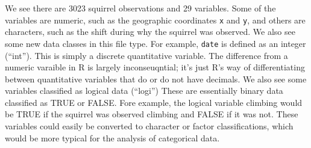 \documentclass[
]{book}
\newenvironment{Shaded}{\begin{snugshade}}{\end{snugshade}}
\newcommand{\ConstantTok}[1]{\textcolor[rgb]{0.56,0.35,0.01}{#1}}
\newcommand{\NormalTok}[1]{#1}
\newcommand{\SpecialCharTok}[1]{\textcolor[rgb]{0.81,0.36,0.00}{\textbf{#1}}}
\begin{document}
\begin{Shaded}
\end{Shaded}

We see there are 3023 squirrel observations and 29 variables. Some of the variables are numeric, such as the geographic coordinates \texttt{x} and \texttt{y}, and others are characters, such as the shift during why the squirrel was observed. We also see some new data classes in this file type. For example, \texttt{date} is defined as an integer (``int''). This is simply a discrete quantitative variable. The difference from a numeric varaible in R is largely inconseuqntial; it's just R's way of differentiating between quantitative variables that do or do not have decimals. We also see some variables classified as logical data (``logi'') These are essentially binary data classified as TRUE or FALSE. Fore example, the logical variable climbing would be TRUE if the squirrel was observed climbing and FALSE if it was not. These variables could easily be converted to character or factor classifications, which would be more typical for the analysis of categorical data.
\end{document}
